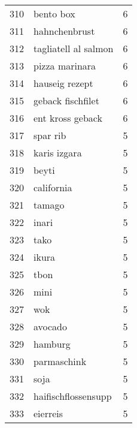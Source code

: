 \begin{tabular}{llr}
310  &                                          bento box &      6 \\
311  &                                      hahnchenbrust &      6 \\
312  &                               tagliatell al salmon &      6 \\
313  &                                     pizza marinara &      6 \\
314  &                                     hauseig rezept &      6 \\
315  &                                  geback fischfilet &      6 \\
316  &                                   ent kross geback &      6 \\
317  &                                           spar rib &      5 \\
318  &                                       karis izgara &      5 \\
319  &                                              beyti &      5 \\
320  &                                         california &      5 \\
321  &                                             tamago &      5 \\
322  &                                              inari &      5 \\
323  &                                               tako &      5 \\
324  &                                              ikura &      5 \\
325  &                                               tbon &      5 \\
326  &                                               mini &      5 \\
327  &                                                wok &      5 \\
328  &                                            avocado &      5 \\
329  &                                            hamburg &      5 \\
330  &                                        parmaschink &      5 \\
331  &                                               soja &      5 \\
332  &                                haifischflossensupp &      5 \\
333  &                                           eierreis &      5 \\

\end{tabular}
